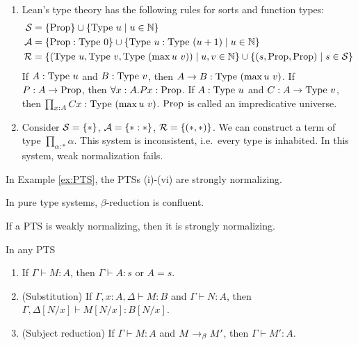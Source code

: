 \begin{example}
\begin{enumerate}
{        }
        \item{
            Lean's type theory has the following rules for sorts and function types:
            \begin{align*}
                \fS &= \{\proptype\} \cup \{ \typeu{u} \mid u \in \bN\} \\
                \fA &= \{\proptype : \typeu{0}\} \cup \{\typeu{u} : \typeu{(u + 1)} \mid u \in \bN\} \\
                \fR &= \{ (\typeu{u}, \typeu{v}, \typeu{(\max u\ v)}) \mid u,v \in \bN\} \cup \{(s, \proptype, \proptype) \mid s \in \fS\}
            \end{align*}
            If $A : \mathrm{Type}\ u$ and $B : \mathrm{Type}\ v$, then $A \to B : \mathrm{Type}\ (\max u\ v)$.
            If $P : A \to \mathrm{Prop}$, then $\forall x : A. Px : \mathrm{Prop}$.
            If $A : \mathrm{Type}\ u$ and $C : A \to \mathrm{Type}\ v$, then $\prod_{x : A} Cx : \mathrm{Type}\ (\max u \ v)$.
            $\mathrm{Prop}$ is called an \alert{impredicative universe}.
        }
        \item {
            Consider $\mathcal{S} = \{*\}$, $\mathcal{A} = \{* :*\}$, $\mathcal{R} = \{(*, *)\}$.
            We can construct a term of type $\prod_{\alpha : *} \alpha$.
            This system is \alert{inconsistent}, i.e.\ every type is inhabited.
            In this system, weak normalization fails.
        }
    \end{enumerate}
\end{example}

\begin{boxlem}
    In Example \ref{ex:PTS}, the PTSs (i)-(vi) are strongly normalizing.
\end{boxlem}

\begin{boxprop}[Confluence]
    In pure type systems, $\beta$-reduction is confluent.
\end{boxprop}

\begin{conj}
    If a PTS is weakly normalizing, then it is strongly normalizing.
\end{conj}

\begin{boxprop}\label{prop:PTS}
    In any PTS
    \begin{enumerate}
        \item If $\Gamma \vdash M : A$, then $\Gamma \vdash A : s$ or $A = s$.
        \item (Substitution) If $\Gamma, x : A, \Delta \vdash M : B$ and $\Gamma \vdash N : A$, then $\Gamma, \Delta[N/x] \vdash M[N/x] : B[N/x]$.
        \item (Subject reduction) If $\Gamma \vdash M : A$ and $M \to_{\beta} M'$, then $\Gamma \vdash M' : A$.
    \end{enumerate}
\end{boxprop}

